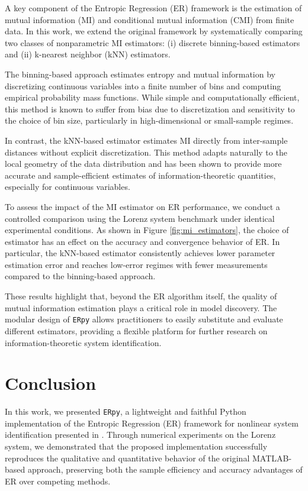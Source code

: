 \documentclass[11pt]{article}
\begin{document}
A key component of the Entropic Regression (ER) framework is the estimation of mutual information (MI) and conditional mutual information (CMI) from finite data. In this work, we extend the original framework by systematically comparing two classes of nonparametric MI estimators: (i) discrete binning-based estimators and (ii) k-nearest neighbor (kNN) estimators.

The binning-based approach estimates entropy and mutual information by discretizing continuous variables into a finite number of bins and computing empirical probability mass functions. While simple and computationally efficient, this method is known to suffer from bias due to discretization and sensitivity to the choice of bin size, particularly in high-dimensional or small-sample regimes.

In contrast, the kNN-based estimator estimates MI directly from inter-sample distances without explicit discretization. This method adapts naturally to the local geometry of the data distribution and has been shown to provide more accurate and sample-efficient estimates of information-theoretic quantities, especially for continuous variables.

To assess the impact of the MI estimator on ER performance, we conduct a controlled comparison using the Lorenz system benchmark under identical experimental conditions. As shown in Figure \ref{fig:mi_estimators}, the choice of estimator has an effect on the accuracy and convergence behavior of ER. In particular, the kNN-based estimator consistently achieves lower parameter estimation error and reaches low-error regimes with fewer measurements compared to the binning-based approach.

These results highlight that, beyond the ER algorithm itself, the quality of mutual information estimation plays a critical role in model discovery. The modular design of \texttt{ERpy} allows practitioners to easily substitute and evaluate different estimators, providing a flexible platform for further research on information-theoretic system identification.

\section{Conclusion} \label{section4}

In this work, we presented \texttt{ERpy}, a lightweight and faithful Python implementation of the Entropic Regression (ER) framework for nonlinear system identification presented in \cite{almomani2020entropic}. Through numerical experiments on the Lorenz system, we demonstrated that the proposed implementation successfully reproduces the qualitative and quantitative behavior of the original MATLAB-based approach, preserving both the sample efficiency and accuracy advantages of ER over competing methods.
\end{document}
